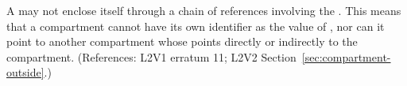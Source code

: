 A \Compartment may not enclose itself through a chain of references
involving the  .  This means that a compartment cannot
have its own identifier as the value of , nor can it point
to another compartment whose   points directly or
indirectly to the compartment.  (References: L2V1 erratum 11; L2V2
Section~\ref{sec:compartment-outside}.)
